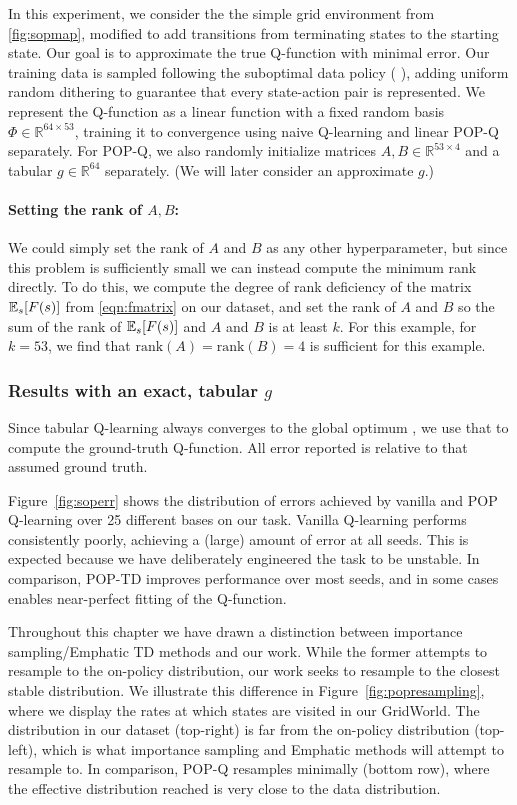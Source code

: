 In this experiment, we consider the the simple grid environment from \cref{fig:sopmap}, modified to add transitions from terminating states to the starting state. Our goal is to approximate the true Q-function with minimal error. Our training data is sampled following the suboptimal data policy ({\color{datapolicy} \datapolicyglyph}), adding uniform random dithering to guarantee that every state-action pair is represented.
We represent the Q-function as a linear function with a fixed random basis $\Phi \in \mathbb R^{64\times 53}$, training it to convergence using naive Q-learning and linear POP-Q separately. For POP-Q, we also randomly initialize matrices $A, B \in \mathbb R^{53\times 4}$ and a tabular $g \in \mathbb R^{64}$ separately. (We will later consider an approximate $g$.)

\paragraph{Setting the rank of $A, B$:}
We could simply set the rank of $A$ and $B$ as any other hyperparameter, but since this problem is sufficiently small we can instead compute the minimum rank directly. To do this, we compute the degree of rank deficiency of the matrix $\mathbb{E}_s [F(s)]$ from \cref*{eqn:fmatrix} on our dataset, and set the rank of $A$ and $B$ so the sum of the rank of $\mathbb{E}_s [F(s)]$ and $A$ and $B$ is at least $k$. For this example, for $k=53$, we find that $\text{rank} (A) = \text{rank} (B) = 4$ is sufficient for this example.

\subsubsection[Results with a tabular g]{Results with an exact, tabular $g$}

Since tabular Q-learning always converges to the global optimum \cite{watkins1992q}, we use that to compute the ground-truth Q-function. All error reported is relative to that assumed ground truth.

Figure~\ref{fig:soperr} shows the distribution of errors achieved by vanilla and POP Q-learning over 25 different bases on our task. Vanilla Q-learning performs consistently poorly, achieving a (large) amount of error at all seeds. This is expected because we have deliberately engineered the task to be unstable. In comparison, POP-TD improves performance over most seeds, and in some cases enables near-perfect fitting of the Q-function.

Throughout this chapter we have drawn a distinction between importance sampling/Emphatic TD methods and our work. While the former attempts to resample to the on-policy distribution, our work seeks to resample to the closest stable distribution. We illustrate this difference in Figure~\ref{fig:popresampling}, where we display the rates at which states are visited in our GridWorld. The distribution in our dataset (top-right) is far from the on-policy distribution (top-left), which is what importance sampling and Emphatic methods will attempt to resample to. In comparison, POP-Q resamples minimally (bottom row), where the effective distribution reached is very close to the data distribution.


